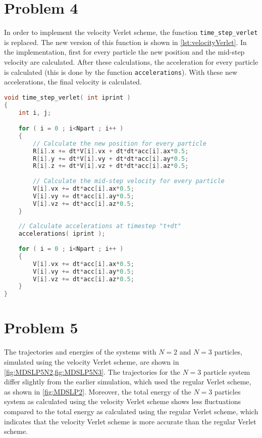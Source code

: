 \documentclass[titlepage]{report}
\begin{document}
\section{Problem 4}
In order to implement the velocity Verlet scheme, the function \lstinline[basicstyle=\ttfamily]|time_step_verlet| is replaced. 
The new version of this function is shown in \cref{lst:velocityVerlet}. 
In the implementation, first for every particle the new position and the mid-step velocity are calculated.
After these calculations, the acceleration for every particle is calculated (this is done by the function \lstinline[basicstyle=\ttfamily]|accelerations|).
With these new accelerations, the final velocity is calculated.

\begin{lstlisting}[language = C,  caption = {Implementation of the velocity Verlet scheme}, label = {lst:velocityVerlet}]
void time_step_verlet( int iprint )
{
	int i, j;

	for ( i = 0 ; i<Npart ; i++ )
	{
		// Calculate the new position for every particle
		R[i].x += dt*V[i].vx + dt*dt*acc[i].ax*0.5;
		R[i].y += dt*V[i].vy + dt*dt*acc[i].ay*0.5;
		R[i].z += dt*V[i].vz + dt*dt*acc[i].az*0.5;
		
		// Calculate the mid-step velocity for every particle
		V[i].vx += dt*acc[i].ax*0.5;
		V[i].vy += dt*acc[i].ay*0.5;
		V[i].vz += dt*acc[i].az*0.5;
	}
	
	// Calculate accelerations at timestep "t+dt"
	accelerations( iprint );  
	
	for ( i = 0 ; i<Npart ; i++ )
	{
		V[i].vx += dt*acc[i].ax*0.5;
		V[i].vy += dt*acc[i].ay*0.5;
		V[i].vz += dt*acc[i].az*0.5;
	}
}
\end{lstlisting}

\section{Problem 5}
The trajectories and energies of the systems with $ N = 2 $ and $ N = 3 $ particles, simulated using the velocity Verlet scheme, are shown in \cref{fig:MDSLP5N2,fig:MDSLP5N3}.
The trajectories for the $ N = 3 $ particle system differ slightly from the earlier simulation, which used the regular Verlet scheme, as shown in \cref{fig:MDSLP2}.
Moreover, the total energy of the $ N = 3 $ particles system as calculated using the velocity Verlet scheme shows less fluctuations compared to the total energy as calculated using the regular Verlet scheme, which indicates that the velocity Verlet scheme is more accurate than the regular Verlet scheme.
\end{document}
